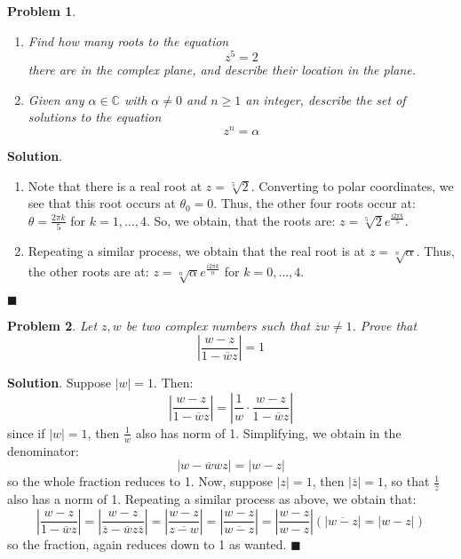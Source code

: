 \documentclass[12pt]{article}
\newcommand{\abs}[1]{\left| #1 \right|} %
\renewcommand{\=}[1]{\stackrel{#1}{=}} %
\newtheorem{p}{Problem}[section]
\theoremstyle{definition}
\newenvironment{s}{%
        \begin{trivlist} \item \textbf{Solution}. }{%
            \hspace*{\fill} $\blacksquare$\end{trivlist}}%
\begin{document}
\begin{p}
    \begin{enumerate}
        \item Find how many roots to the equation \[ z^5 = 2 \] there are in the complex
            plane, and describe their location in the plane.
        \item Given any $\alpha\in\mathbb{C}$ with $\alpha\neq0$ and $n\geq1$ an integer,
            describe the set of solutions to the equation \[ z^n = \alpha \]
    \end{enumerate}
\end{p}
\begin{s}
    \begin{enumerate}
        \item Note that there is a real root at $z = \sqrt[5]{2}$. Converting to polar
            coordinates, we see that this root occurs at $\theta_0 = 0$. Thus, the other
            four roots occur at: $\theta = \frac{2\pi k}{5}$ for $k = 1,\hdots,4$. So,
            we obtain, that the roots are: $z = \sqrt[5]{2}e^{\frac{i2\pi k}{5}}$.
        \item Repeating a similar process, we obtain that the real root is at 
            $z = \sqrt[n]{\alpha}$. Thus, the other roots are at: 
            $z = \sqrt[n]{\alpha}e^{\frac{i2\pi k}{n}}$ for $k = 0,\hdots,4$.
    \end{enumerate}
\end{s}

\begin{p}
    Let $z,w$ be two complex numbers such that $\overline{z}w\neq 1$. Prove that
    \[ \abs{\frac{w-z}{1-\overline{w}{z}}} = 1\]
\end{p}
\begin{s}
    Suppose $\abs{w} = 1$. Then:
    \[ \abs{\frac{w-z}{1-\overline{w}{z}}} = \abs{\frac{1}{w}\cdot\frac{w-z}{1-\overline{w}{z}}}\]
    since if $\abs{w} = 1$, then $\frac{1}{w}$ also has norm of 1. Simplifying, we obtain in the denominator:
    \[\abs{w - \overline{w}wz} = \abs{w - z} \]
    so the whole fraction reduces to 1. Now, suppose $\abs{z} = 1$, then $\abs{\overline{z}} = 1$, so that
    $\frac{1}{\overline{z}}$ also has a norm of 1. Repeating a similar process as above, we obtain that:
    \[ \abs{\frac{w-z}{1-\overline{w}z}} = \abs{\frac{w-z}{\overline{z} - \overline{w}z\overline{z}}} = \abs{\frac{w-z}{\overline{z-w}}} = \abs{\frac{w-z}{\overline{w-z}}} = \abs{\frac{w-z}{w-z}} (\abs{\overline{w-z}} = \abs{w-z})\]
    so the fraction, again reduces down to 1 as wanted.
\end{s}
\end{document}
